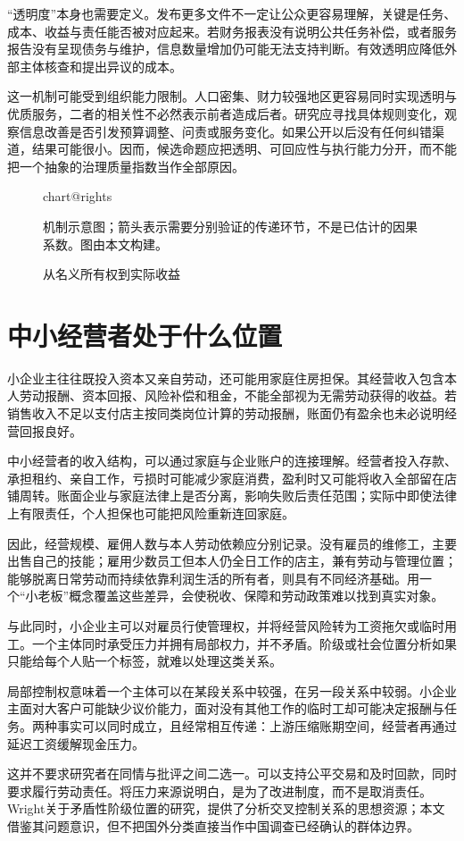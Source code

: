 \documentclass[UTF8,fontset=fandol,zihao=-4,oneside,openany]{ctexbook}
\makeatletter
\newcommand{\Chart}[3]{\begin{figure}[htbp]\centering\csname chart@#1\endcsname\caption{#2}\par\small #3\end{figure}}
\makeatother
\begin{document}
\label{arg:P089}
“透明度”本身也需要定义。发布更多文件不一定让公众更容易理解，关键是任务、成本、收益与责任能否被对应起来。若财务报表没有说明公共任务补偿，或者服务报告没有呈现债务与维护，信息数量增加仍可能无法支持判断。有效透明应降低外部主体核查和提出异议的成本。

这一机制可能受到组织能力限制。人口密集、财力较强地区更容易同时实现透明与优质服务，二者的相关性不必然表示前者造成后者。研究应寻找具体规则变化，观察信息改善是否引发预算调整、问责或服务变化。如果公开以后没有任何纠错渠道，结果可能很小。因而，候选命题应把透明、可回应性与执行能力分开，而不能把一个抽象的治理质量指数当作全部原因。

\Chart{rights}{从名义所有权到实际收益}{机制示意图；箭头表示需要分别验证的传递环节，不是已估计的因果系数。图由本文构建。}

\section{中小经营者处于什么位置}
小企业主往往既投入资本又亲自劳动，还可能用家庭住房担保。其经营收入包含本人劳动报酬、资本回报、风险补偿和租金，不能全部视为无需劳动获得的收益。若销售收入不足以支付店主按同类岗位计算的劳动报酬，账面仍有盈余也未必说明经营回报良好。

\label{arg:P090}
中小经营者的收入结构，可以通过家庭与企业账户的连接理解。经营者投入存款、承担租约、亲自工作，亏损时可能减少家庭消费，盈利时又可能将收入全部留在店铺周转。账面企业与家庭法律上是否分离，影响失败后责任范围；实际中即使法律上有限责任，个人担保也可能把风险重新连回家庭。

因此，经营规模、雇佣人数与本人劳动依赖应分别记录。没有雇员的维修工，主要出售自己的技能；雇用少数员工但本人仍全日工作的店主，兼有劳动与管理位置；能够脱离日常劳动而持续依靠利润生活的所有者，则具有不同经济基础。用一个“小老板”概念覆盖这些差异，会使税收、保障和劳动政策难以找到真实对象。

与此同时，小企业主可以对雇员行使管理权，并将经营风险转为工资拖欠或临时用工。一个主体同时承受压力并拥有局部权力，并不矛盾。阶级或社会位置分析如果只能给每个人贴一个标签，就难以处理这类关系。

\label{arg:P091}
局部控制权意味着一个主体可以在某段关系中较强，在另一段关系中较弱。小企业主面对大客户可能缺少议价能力，面对没有其他工作的临时工却可能决定报酬与任务。两种事实可以同时成立，且经常相互传递：上游压缩账期空间，经营者再通过延迟工资缓解现金压力。

这并不要求研究者在同情与批评之间二选一。可以支持公平交易和及时回款，同时要求履行劳动责任。将压力来源说明白，是为了改进制度，而不是取消责任。Wright关于矛盾性阶级位置的研究，提供了分析交叉控制关系的思想资源；本文借鉴其问题意识，但不把国外分类直接当作中国调查已经确认的群体边界。\cite{Wright1985}
\end{document}
